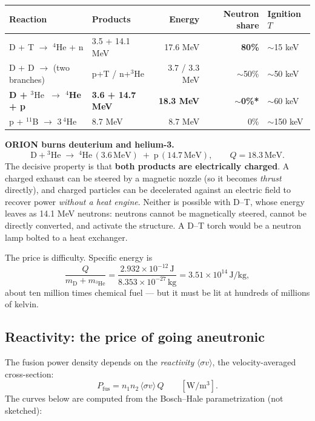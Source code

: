 \documentclass[11pt]{article}
\newcommand{\he}{\ensuremath{{}^3\mathrm{He}}}
\newcommand{\unit}[1]{\,\mathrm{#1}}
\begin{document}
\begin{center}\small
\begin{tabular}{@{}llrrl@{}}
\toprule
Reaction & Products & Energy & Neutron share & Ignition $T$\\
\midrule
D + T $\to$ $^4$He + n & 3.5 + 14.1 MeV & 17.6 MeV & \textbf{80\%} & $\sim$15 keV\\
D + D $\to$ (two branches) & p+T / n+$^3$He & 3.7 / 3.3 MeV & $\sim$50\% & $\sim$50 keV\\
\textbf{D + \he\ $\to$ $^4$He + p} & \textbf{3.6 + 14.7 MeV} & \textbf{18.3 MeV} & \textbf{$\sim$0\%*} & $\sim$60 keV\\
p + $^{11}$B $\to$ 3\,$^4$He & 8.7 MeV & 8.7 MeV & 0\% & $\sim$150 keV\\
\bottomrule
\end{tabular}
\end{center}

\textbf{ORION burns deuterium and helium-3.}
\begin{equation}
\mathrm{D} + \he \;\longrightarrow\; {}^4\mathrm{He}\,(3.6\unit{MeV}) \;+\; \mathrm{p}\,(14.7\unit{MeV}),
\qquad Q = 18.3\unit{MeV}.
\end{equation}
The decisive property is that \textbf{both products are electrically charged}. A charged exhaust can be steered by a magnetic nozzle (so it becomes \emph{thrust} directly), and charged particles can be decelerated against an electric field to recover power \emph{without a heat engine}. Neither is possible with D--T, whose energy leaves as 14.1 MeV neutrons: neutrons cannot be magnetically steered, cannot be directly converted, and activate the structure. A D--T torch would be a neutron lamp bolted to a heat exchanger.

The price is difficulty. Specific energy is
\begin{equation}
\frac{Q}{m_{\mathrm{D}}+m_{\he}}=\frac{2.932\times10^{-12}\unit{J}}{8.353\times10^{-27}\unit{kg}}
= 3.51\times10^{14}\unit{J/kg},
\end{equation}
about ten million times chemical fuel --- but it must be lit at hundreds of millions of kelvin.

\subsection{Reactivity: the price of going aneutronic}
The fusion power density depends on the \emph{reactivity} $\langle\sigma v\rangle$, the velocity-averaged cross-section:
\begin{equation}
P_{\text{fus}} = n_1 n_2 \,\langle\sigma v\rangle\, Q \qquad [\mathrm{W/m^3}].
\end{equation}
The curves below are computed from the Bosch--Hale parametrization (not sketched):
\end{document}
